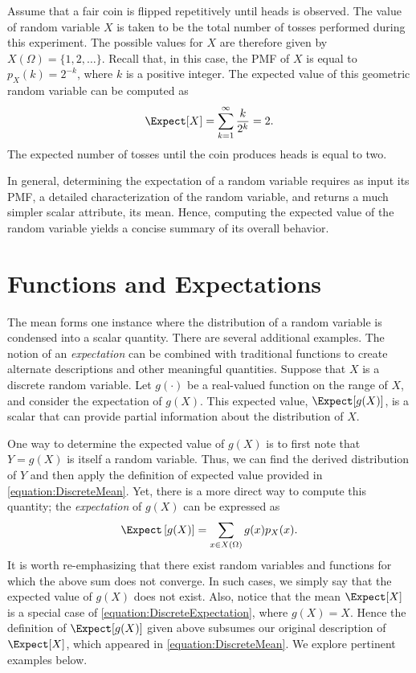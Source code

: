 \begin{example}
Assume that a fair coin is flipped repetitively until heads is observed.
The value of random variable $X$ is taken to be the total number of tosses performed during this experiment.
The possible values for $X$ are therefore given by $X (\Omega) = \{ 1, 2, \ldots \}$.
Recall that, in this case, the PMF of $X$ is equal to $p_X(k) = 2^{-k}$, where $k$ is a positive integer.
The expected value of this geometric random variable can be computed as
\begin{equation*}
\Expect [X] = \sum_{k=1}^{\infty} \frac{k}{2^k}
= 2.
\end{equation*}
The expected number of tosses until the coin produces heads is equal to two.
\end{example}

In general, determining the expectation of a random variable requires as input its PMF, a detailed characterization of the random variable, and returns a much simpler scalar attribute, its mean.
Hence, computing the expected value of the random variable yields a concise summary of its overall behavior.


\section{Functions and Expectations}

The mean forms one instance where the distribution of a random variable is condensed into a scalar quantity.
There are several additional examples.
The notion of an \emph{expectation} can be combined with traditional functions to create alternate descriptions and other meaningful quantities. 
Suppose that $X$ is a discrete random variable.
Let $g(\cdot)$ be a real-valued function on the range of $X$, and consider the expectation of $g(X)$.
This expected value, $\Expect [g(X)]$, is a scalar that can provide partial information about the distribution of $X$.

One way to determine the expected value of $g(X)$ is to first note that $Y = g(X)$ is itself a random variable.
Thus, we can find the derived distribution of $Y$ and then apply the definition of expected value provided in \eqref{equation:DiscreteMean}.
Yet, there is a more direct way to compute this quantity;
the \emph{expectation} of $g(X)$ can be expressed as 
\begin{equation} \label{equation:DiscreteExpectation}
\Expect \left[ g(X) \right]
= \sum_{x \in X(\Omega)} g(x) p_X (x) .
\end{equation}
It is worth re-emphasizing that there exist random variables and functions for which the above sum does not converge.
In such cases, we simply say that the expected value of $g(X)$ does not exist.
Also, notice that the mean $\Expect [X]$ is a special case of \eqref{equation:DiscreteExpectation}, where $g(X) = X$.
Hence the definition of $\Expect [g(X)]$ given above subsumes our original description of $\Expect [X]$, which appeared in \eqref{equation:DiscreteMean}.
We explore pertinent examples below.

